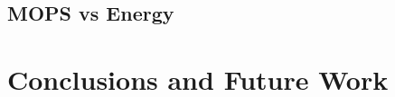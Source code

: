 \documentclass[12pt]{article}
\begin{document}
\begin{CJK}{UTF8}{bkai}
    \subsection{MOPS vs Energy}

\section{Conclusions and Future Work}

\clearpage

\singlespacing

\printbibliography

\end{CJK}
\end{document}
